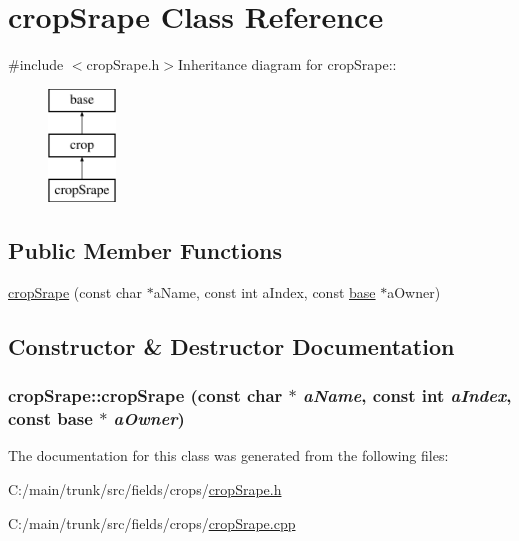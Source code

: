 \hypertarget{classcrop_srape}{
\section{cropSrape Class Reference}
\label{classcrop_srape}
}


{\ttfamily \#include $<$cropSrape.h$>$}Inheritance diagram for cropSrape::\begin{figure}[H]
\begin{center}
\leavevmode
\includegraphics[height=3cm]{classcrop_srape}
\end{center}
\end{figure}
\subsection*{Public Member Functions}
\begin{DoxyCompactItemize}
\item 
\hyperlink{classcrop_srape_add32efa62ad358c9f9e345acf57f8737}{cropSrape} (const char $\ast$aName, const int aIndex, const \hyperlink{classbase}{base} $\ast$aOwner)
\end{DoxyCompactItemize}


\subsection{Constructor \& Destructor Documentation}
\hypertarget{classcrop_srape_add32efa62ad358c9f9e345acf57f8737}{
\subsubsection[{cropSrape}]{\setlength{\rightskip}{0pt plus 5cm}cropSrape::cropSrape (const char $\ast$ {\em aName}, \/  const int {\em aIndex}, \/  const {\bf base} $\ast$ {\em aOwner})}}
\label{classcrop_srape_add32efa62ad358c9f9e345acf57f8737}


The documentation for this class was generated from the following files:\begin{DoxyCompactItemize}
\item 
C:/main/trunk/src/fields/crops/\hyperlink{crop_srape_8h}{cropSrape.h}\item 
C:/main/trunk/src/fields/crops/\hyperlink{crop_srape_8cpp}{cropSrape.cpp}\end{DoxyCompactItemize}
